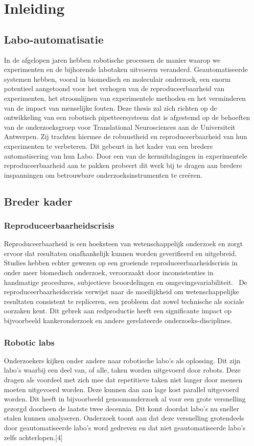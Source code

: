 \chapter{Inleiding}
\section{Labo-automatisatie}
In de afgelopen jaren hebben robotische processen de manier waarop we experimenten en de bijhorende labotaken uitvoeren veranderd. Geautomatiseerde systemen hebben, vooral in biomedisch en moleculair onderzoek, een enorm potentieel aangetoond voor het verhogen van de reproduceerbaarheid van experimenten, het stroomlijnen van experimentele methoden en het verminderen van de impact van menselijke fouten.\cite{RN5} Deze thesis zal zich richten op de ontwikkeling van een robotisch pipetteersysteem dat is afgestemd op de behoeften van de onderzoeksgroep voor Translational Neurosciences aan de Universiteit Antwerpen. Zij trachten hiermee de robuustheid en reproduceerbaarheid van hun experimenten te verbeteren. Dit gebeurt in het kader van een bredere automatisering van hun Labo. Door een van de kernuitdagingen in experimentele reproduceerbaarheid aan te pakken probeert dit werk bij te dragen aan bredere inspanningen om betrouwbare onderzoeksinstrumenten te creëren.

\section{Breder kader}
\subsection{Reproduceerbaarheidscrisis}
Reproduceerbaarheid is een hoeksteen van wetenschappelijk onderzoek en zorgt ervoor dat resultaten onafhankelijk kunnen worden geverifieerd en uitgebreid. Studies hebben echter gewezen op een groeiende reproduceerbaarheidscrisis in onder meer biomedisch onderzoek, veroorzaakt door inconsistenties in handmatige procedures, subjectieve beoordelingen en omgevingsvariabiliteit.\ \cite{RN2} De reproduceerbaarheidscrisis verwijst naar de moeilijkheid om wetenschappelijke resultaten consistent te repliceren, een probleem dat zowel technische als sociale oorzaken kent. Dit gebrek aan redproductie heeft een significante impact op bijvoorbeeld kankeronderzoek en andere gerelateerde onderzoeks-disciplines.\ \cite{RN4}
\subsection{Robotic labs}
Onderzoekers kijken onder andere naar robotische labo’s als oplossing. Dit zijn labo’s waarbij een deel van, of alle, taken worden uitgevoerd door robots. Deze dragen als voordeel met zich mee dat repetitieve taken niet langer door mensen moeten uitgevoerd worden. Deze kunnen dan aan lage kost parallel uitgevoerd worden. Dit heeft in bijvoorbeeld genoomonderzoek al voor een grote versnelling gezorgd doorheen de laatste twee decennia. Dit komt doordat labo’s nu sneller stalen kunnen analyseren. Onderzoek toont aan dat deze versnelling grotendeels door geautomatiseerde labo’s word gedreven en dat niet geautomatiseerde labo’s zelfs achterlopen.[4]

